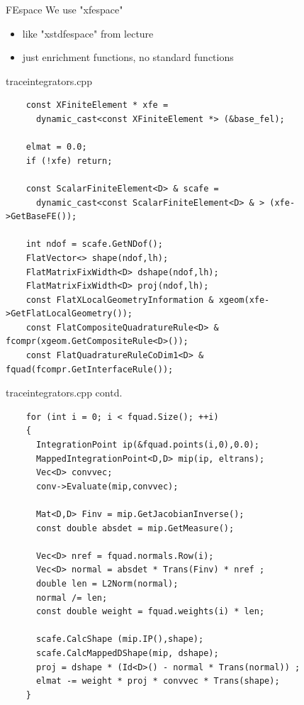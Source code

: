 \documentclass[11pt]{beamer}
\theoremstyle{plain}
\theoremstyle{definition}
\theoremstyle{remark}
\begin{document}
\begin{frame}{FEspace}
	We use "xfespace"
	\pause
	\begin{itemize}[<+->]
		\item{like "xstdfespace" from lecture}
		\item{just enrichment functions, no standard functions}
	\end{itemize}
\end{frame}

	\lstset{language=C++}
\begin{frame}[fragile]{traceintegrators.cpp} 

	\begin{lstlisting}
    const XFiniteElement * xfe =
      dynamic_cast<const XFiniteElement *> (&base_fel);

    elmat = 0.0;
    if (!xfe) return;

    const ScalarFiniteElement<D> & scafe =
      dynamic_cast<const ScalarFiniteElement<D> & > (xfe->GetBaseFE());

    int ndof = scafe.GetNDof();
    FlatVector<> shape(ndof,lh);
    FlatMatrixFixWidth<D> dshape(ndof,lh);
    FlatMatrixFixWidth<D> proj(ndof,lh);
    const FlatXLocalGeometryInformation & xgeom(xfe->GetFlatLocalGeometry());
    const FlatCompositeQuadratureRule<D> & fcompr(xgeom.GetCompositeRule<D>());
    const FlatQuadratureRuleCoDim1<D> & fquad(fcompr.GetInterfaceRule());
	\end{lstlisting}
\end{frame}

\begin{frame}[fragile]{traceintegrators.cpp contd.}
	\begin{lstlisting}
    for (int i = 0; i < fquad.Size(); ++i)
    {
      IntegrationPoint ip(&fquad.points(i,0),0.0);
      MappedIntegrationPoint<D,D> mip(ip, eltrans);
      Vec<D> convvec;
      conv->Evaluate(mip,convvec);

      Mat<D,D> Finv = mip.GetJacobianInverse();
      const double absdet = mip.GetMeasure();

      Vec<D> nref = fquad.normals.Row(i);
      Vec<D> normal = absdet * Trans(Finv) * nref ;
      double len = L2Norm(normal);
      normal /= len;
      const double weight = fquad.weights(i) * len;

      scafe.CalcShape (mip.IP(),shape);
      scafe.CalcMappedDShape(mip, dshape);
      proj = dshape * (Id<D>() - normal * Trans(normal)) ;
      elmat -= weight * proj * convvec * Trans(shape);
    }	
	\end{lstlisting}
\end{frame}
\end{document}
